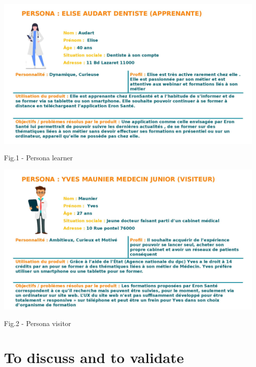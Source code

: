 \documentclass[
  12pt,
]{article}
\begin{document}
\includegraphics{../../Persona/Persona_Elise_Audart_Dentiste_Apprenante_Eron.jpg}

Fig.1 - Persona learner

\includegraphics{../../Persona/Persona_Yves_Maunier_Medecin_Junior.jpg}

Fig.2 - Persona visitor

\hypertarget{to-discuss-and-to-validate}{%
\section{To discuss and to validate}\label{to-discuss-and-to-validate}}
\end{document}
